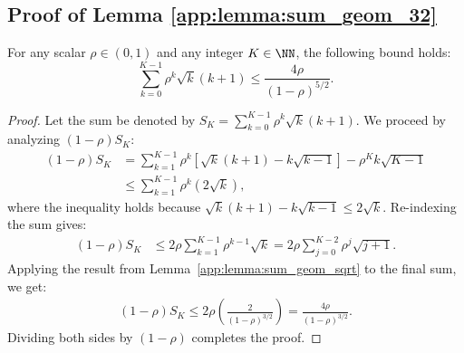 \documentclass[11pt, letterpaper]{article}
\begin{document}
\subsection{Proof of Lemma \ref{app:lemma:sum_geom_32}}
\begin{lemma}
\label{app:lemma:sum_geom_32}
For any scalar $\rho \in (0, 1)$ and any integer $K \in \NN$, the following bound holds:
\begin{equation}
    \label{app:eq:sum_geom_32_lemma9}
    \sum_{k = 0}^{K - 1} \rho^k \sqrt{k} (k + 1)
    \leq \frac{4 \rho}{(1 - \rho)^{5/2}}.
\end{equation}
\end{lemma}
\begin{proof}
Let the sum be denoted by $S_K = \sum_{k = 0}^{K - 1} \rho^k \sqrt{k} (k + 1)$. We proceed by analyzing $(1-\rho)S_K$:
\begin{align*}
    (1-\rho)S_K &= \sum_{k = 1}^{K - 1} \rho^k \left[ \sqrt{k} (k + 1) - k\sqrt{k - 1}\right] - \rho^K k \sqrt{K-1} \\
    &\leq \sum_{k = 1}^{K - 1} \rho^k (2\sqrt{k}),
\end{align*}
where the inequality holds because $\sqrt{k} (k + 1) - k\sqrt{k - 1} \le 2\sqrt{k}$. Re-indexing the sum gives:
\begin{align*}
    (1 - \rho) S_K &\leq 2 \rho \sum_{k = 1}^{K - 1} \rho^{k-1} \sqrt{k} = 2 \rho \sum_{j = 0}^{K - 2} \rho^j \sqrt{j + 1}.
\end{align*}
Applying the result from Lemma~\ref{app:lemma:sum_geom_sqrt} to the final sum, we get:
\begin{align*}
     (1 - \rho) S_K  \leq 2 \rho \left( \frac{2}{(1 - \rho)^{3/2}} \right) = \frac{4 \rho}{(1 - \rho)^{3/2}}.
\end{align*}
Dividing both sides by $(1-\rho)$ completes the proof.
\end{proof}
\end{document}
